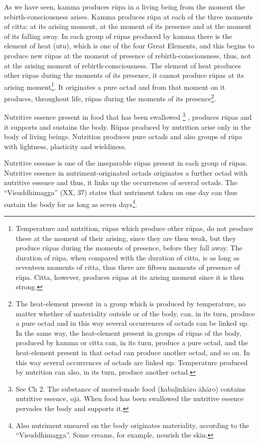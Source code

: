 \documentclass{book}
\begin{document}
As we have seen, kamma produces r\=upa in a living being from the moment
the rebirth-consciousness arises. Kamma produces r\=upa at each of
the three moments of citta: at its arising moment, at the moment of its
presence and at the moment of its falling away. In each group of
r\=upas produced by kamma there is the element of heat (utu), which is
one of the four Great Elements, and this begins to produce new r\=upas
at the moment of presence of rebirth-consciousness, thus, not at the
arising moment of rebirth-consciousness. The element of heat produces
other r\=upas during the moments of its presence, it cannot produce
r\=upas at its arising moment\footnote{Temperature and nutrition,
r\=upas which produce other r\=upas, do not produce these at the moment
of their arising, since they are then weak, but they produce r\=upas
during the moments of presence, before they fall away. The duration of
r\=upa, when compared with the duration of citta, is as long as
seventeen moments of citta, thus there are fifteen moments of presence
of r\=upa. Citta, however, produces r\=upas at its arising moment since
it is then strong.}. It originates a pure octad and from that moment
on it produces, throughout life, r\=upas during the moments of its
presence\footnote{The heat-element present in a group which is
produced by temperature, no matter whether of materiality outside or of
the body, can, in its turn, produce a pure octad and in this way
several occurrences of octads can be linked up. In the same way, the
heat-element present in groups of r\=upas of the body, produced by
kamma or citta can, in its turn, produce a pure octad, and the
heat-element present in that octad can produce another octad, and so
on. In this way several occurrences of octads are linked
up. Temperature produced by nutrition can also, in
its turn, produce another octad. }. 

Nutritive essence present in food that has been swallowed
\footnote{See Ch 2. The substance of morsel-made food
(kaba\d link{\=a}ro {\=a}h{\=a}ro) contains nutritive essence, oj{\=a}.
When food has been swallowed the nutritive essence pervades the body
and supports it.} , produces r\=upas and it supports and sustains the
body. R\=upas produced by nutrition arise only in the body of living
beings. Nutrition produces pure octads and also groups of r\=upa with
lightness, plasticity and wieldiness. 

Nutritive essense is one of the inseparable r\=upas present in each
group of r\=upas. Nutritive essence in nutriment-originated octads
originates a further octad with nutritive essence and thus, it links up
the occurrences of several octads. The ``Visuddhimagga'' (XX, 37)
states that nutriment taken on one day can thus sustain the body for as
long as seven days\footnote{Also nutriment smeared on the body
originates materiality, according to the ``Visuddhimagga''. Some
creams, for example, nourish the skin.}. 
\end{document}
